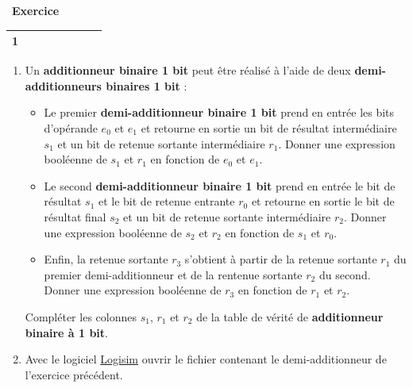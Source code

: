 \documentclass[
  11pt,
]{article}
\providecommand{\tightlist}{%
  \setlength{\itemsep}{0pt}\setlength{\parskip}{0pt}}
\newcounter{exo}
\newenvironment{exercice}[1]
{\par \medskip   \addtocounter{exo}{1} \noindent  
\begin{bclogo}[arrondi =0.1,   noborder = true, logo=\bccrayon, marge=4]{~\textbf{Exercice} \textbf{\theexo} {\itshape #1} }  \par}
{
\end{bclogo}
 \par \bigskip }
\newcounter{def}
\newcounter{logi}
\begin{document}
\begin{exercice}{}
\begin{longtable}[]{@{}clllllll@{}}
\begin{minipage}[t]{0.05\columnwidth}
1\strut
\end{minipage} & \begin{minipage}[t]{0.14\columnwidth}\raggedright
\strut
\end{minipage} & \begin{minipage}[t]{0.12\columnwidth}\raggedright
\strut
\end{minipage} & \begin{minipage}[t]{0.14\columnwidth}\raggedright
\strut
\end{minipage} & \begin{minipage}[t]{0.12\columnwidth}\raggedright
\strut
\end{minipage} & \begin{minipage}[t]{0.12\columnwidth}\raggedright
\strut
\end{minipage}\tabularnewline
\bottomrule
\end{longtable}

\begin{enumerate}
\def\labelenumi{\arabic{enumi}.}
\setcounter{enumi}{1}
\item
  Un \textbf{additionneur binaire 1 bit} peut être réalisé à l'aide de
  deux \textbf{demi-additionneurs binaires 1 bit} :

  \begin{itemize}
  \tightlist
  \item
    Le premier \textbf{demi-additionneur binaire 1 bit} prend en entrée
    les bits d'opérande \(e_{0}\) et \(e_{1}\) et retourne en sortie un
    bit de résultat intermédiaire \(s_{1}\) et un bit de retenue
    sortante intermédiaire \(r_{1}\). Donner une expression booléenne de
    \(s_{1}\) et \(r_{1}\) en fonction de \(e_{0}\) et \(e_{1}\).
  \item
    Le second \textbf{demi-additionneur binaire 1 bit} prend en entrée
    le bit de résultat \(s_{1}\) et le bit de retenue entrante \(r_{0}\)
    et retourne en sortie le bit de résultat final \(s_{2}\) et un bit
    de retenue sortante intermédiaire \(r_{2}\). Donner une expression
    booléenne de \(s_{2}\) et \(r_{2}\) en fonction de \(s_{1}\) et
    \(r_{0}\).
  \item
    Enfin, la retenue sortante \(r_{3}\) s'obtient à partir de la
    retenue sortante \(r_{1}\) du premier demi-additionneur et de la
    rentenue sortante \(r_{2}\) du second. Donner une expression
    booléenne de \(r_{3}\) en fonction de \(r_{1}\) et \(r_{2}\).
  \end{itemize}

  Compléter les colonnes \(s_{1}\), \(r_{1}\) et \(r_{2}\) de la table
  de vérité de \textbf{additionneur binaire à 1 bit}.
\item
  Avec le logiciel \href{http://www.cburch.com/logisim/}{Logisim} ouvrir
  le fichier contenant le demi-additionneur de l'exercice précédent.


\end{enumerate}
\end{exercice}
\end{document}
